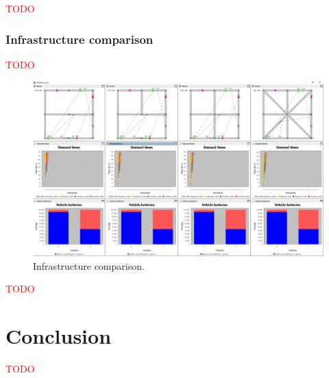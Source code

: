 \documentclass[10pt,twocolumn]{article}
\begin{document}
\textcolor{red}{TODO}

\subsubsection{Infrastructure comparison}
\label{sec:infrastructure-comparison}

\textcolor{red}{TODO}

\begin{figure}[!ht]
    \includegraphics[width=\columnwidth]{../../screenshots/infrastructure-comparison.png}
    \caption{Infrastructure comparison.}
    \label{fig:infratructure-comparison}
\end{figure}

\textcolor{red}{TODO}

\section{Conclusion}
\label{sec:conclusion}

\textcolor{red}{TODO}



\end{document}
